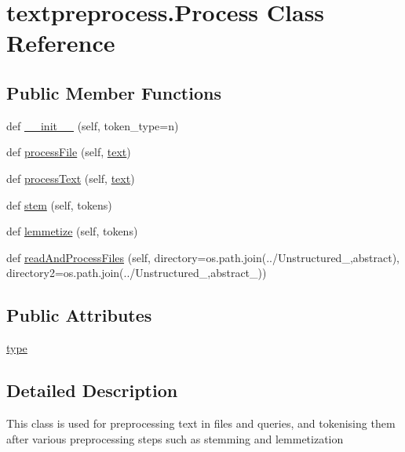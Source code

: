 \hypertarget{classtextpreprocess_1_1_process}{}\section{textpreprocess.\+Process Class Reference}
\label{classtextpreprocess_1_1_process}
\subsection*{Public Member Functions}
\begin{DoxyCompactItemize}
\item 
def \hyperlink{classtextpreprocess_1_1_process_a11ddde752763b87b089e5e709e7531d8}{\+\_\+\+\_\+init\+\_\+\+\_\+} (self, token\+\_\+type=\textquotesingle{}n\textquotesingle{})
\item 
def \hyperlink{classtextpreprocess_1_1_process_a8ae54384642ccd5f1a682616f3aa90ae}{process\+File} (self, \hyperlink{jquery-3_82_81_8js_a95b91e2a7e965b381c9e803999f9d290}{text})
\item 
def \hyperlink{classtextpreprocess_1_1_process_a55c261cfbf99c7c085c21b652a051c0b}{process\+Text} (self, \hyperlink{jquery-3_82_81_8js_a95b91e2a7e965b381c9e803999f9d290}{text})
\item 
def \hyperlink{classtextpreprocess_1_1_process_a6523f58d5c1028d39e30363452044d60}{stem} (self, tokens)
\item 
def \hyperlink{classtextpreprocess_1_1_process_a3b12c1d82f82ade3033cc4fe071c3d67}{lemmetize} (self, tokens)
\item 
def \hyperlink{classtextpreprocess_1_1_process_a7fdd646913124569913bc838f88a9ffe}{read\+And\+Process\+Files} (self, directory=os.\+path.\+join(\textquotesingle{}../Unstructured\+\_\+\textquotesingle{},\textquotesingle{}abstract\textquotesingle{}), directory2=os.\+path.\+join(\textquotesingle{}../Unstructured\+\_\+\textquotesingle{},\textquotesingle{}abstract\+\_\+\textquotesingle{}))
\end{DoxyCompactItemize}
\subsection*{Public Attributes}
\begin{DoxyCompactItemize}
\item 
\hyperlink{classtextpreprocess_1_1_process_a79fe786561553b771bf7db0759d6d311}{type}
\end{DoxyCompactItemize}


\subsection{Detailed Description}
\begin{DoxyVerb}This class is used for preprocessing text in files and queries, and tokenising 
them after various preprocessing steps such as stemming and lemmetization\end{DoxyVerb}
 

